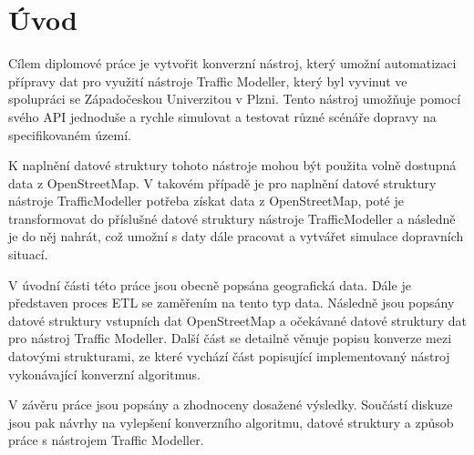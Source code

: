 \chapter{Úvod}

Cílem diplomové práce je vytvořit konverzní nástroj, který umožní automatizaci přípravy dat pro využití nástroje Traffic Modeller, který byl vyvinut ve spolupráci se Západočeskou Univerzitou v Plzni. Tento nástroj umožňuje pomocí svého API jednoduše a rychle simulovat a testovat různé scénáře dopravy na specifikovaném území.

K naplnění datové struktury tohoto nástroje mohou být použita volně dostupná data z OpenStreetMap. V takovém případě je pro naplnění datové struktury nástroje TrafficModeller potřeba získat data z OpenStreetMap, poté je transformovat do příslušné datové struktury nástroje TrafficModeller a následně je do něj nahrát, což umožní s daty dále pracovat a vytvářet simulace dopravních situací. 

V úvodní části této práce jsou obecně popsána geografická data. Dále je představen proces ETL se zaměřením na tento typ data. Následně jsou popsány datové struktury vstupních dat OpenStreetMap a očekávané datové struktury dat pro nástroj Traffic Modeller. Další část se detailně věnuje popisu konverze mezi datovými strukturami, ze které vychází část popisující implementovaný nástroj vykonávající konverzní algoritmus. 
 
V závěru práce jsou popsány a zhodnoceny dosažené výsledky. Součástí diskuze jsou pak návrhy na vylepšení konverzního algoritmu, datové struktury a způsob práce s nástrojem Traffic Modeller.